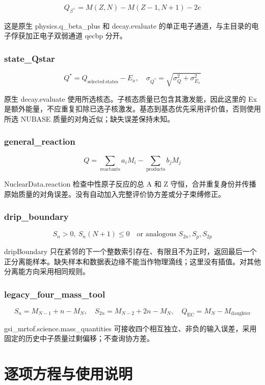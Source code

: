 \documentclass[
  11pt,
  letterpaper,
]{article}
\begin{document}
\[
Q_{\beta^+}=M(Z,N)-M(Z-1,N+1)-2e
\]

这是原生 physics.q\_beta\_plus 和 decay.evaluate
的单正电子通道，与主目录的电子俘获加正电子双弱通道 qecbp 分开。

\subsubsection{state\_Qstar}\label{state_qstar}

\[
Q^*=Q_{\mathrm{selected\ states}}-E_x,\quad \sigma_{Q^*}=\sqrt{\sigma_Q^2+\sigma_{E_x}^2}
\]

原生 decay.evaluate 使用所选核态。子核态质量已包含其激发能，因此这里的
Ex
是额外能量，不应重复扣除已选子核激发。基态到基态优先采用评价值，否则使用所选
NUBASE 质量的对角近似；缺失误差保持未知。

\subsubsection{general\_reaction}\label{general_reaction}

\[
Q=\sum_{\mathrm{reactants}}a_i M_i-\sum_{\mathrm{products}}b_j M_j
\]

NuclearData.reaction 检查中性原子反应的总 A 和 Z
守恒，合并重复身份并传播原始质量的对角误差。没有自动加入完整评价协方差或分子束缚修正。

\subsubsection{drip\_boundary}\label{drip_boundary}

\[
S_n>0,\ S_n(N+1)\leq0\quad\text{or analogous }S_{2n},S_p,S_{2p}
\]

dripBoundary
只在紧邻的下一个整数索引存在、有限且不为正时，返回最后一个正分离能样本。缺失样本和数据表边缘不能当作物理滴线；这里没有插值。对其他分离能方向采用相同规则。

\subsubsection{legacy\_four\_mass\_tool}\label{legacy_four_mass_tool}

\[
S_n=M_{N-1}+n-M_N,\quad S_{2n}=M_{N-2}+2n-M_N,\quad Q_{\mathrm{EC}}=M_N-M_{\mathrm{daughter}}
\]

gsi\_mrtof.science.mass\_quantities
可接收四个相互独立、非负的输入误差，采用固定的历史中子质量过剩偏移；不查询协方差。

\section{逐项方程与使用说明}\label{ux9010ux9879ux65b9ux7a0bux4e0eux4f7fux7528ux8bf4ux660e}
\end{document}
